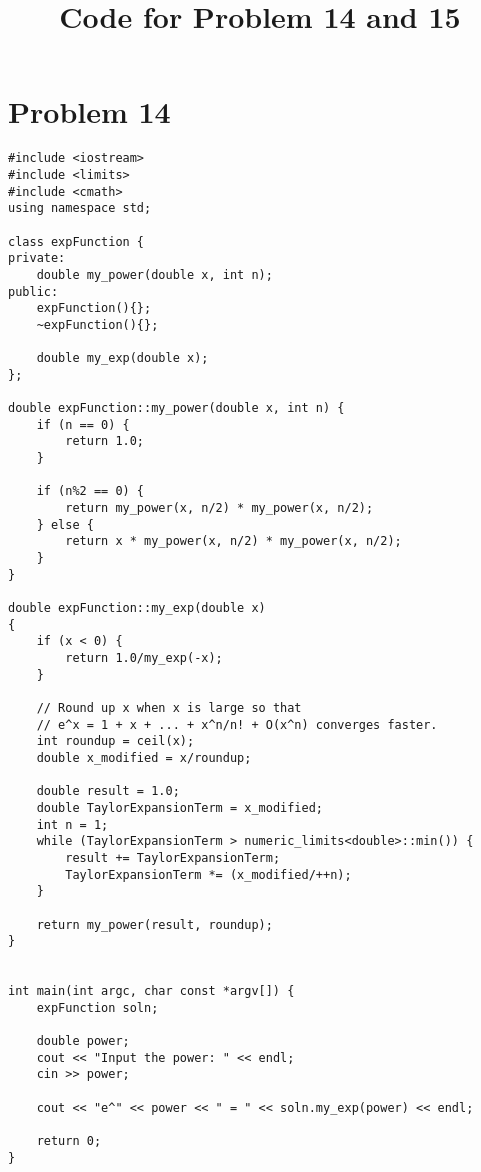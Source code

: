\documentclass[a4paper, 11pt]{amsart}
\theoremstyle{remark}
\numberwithin{equation}{section}
\begin{document}
\title[Code for Problem 14 and 15]{Code for Problem 14 and 15}

\maketitle






\section*{Problem 14}
\begin{lstlisting}
#include <iostream>
#include <limits>
#include <cmath>
using namespace std;

class expFunction {
private:
	double my_power(double x, int n);
public:
	expFunction(){};
	~expFunction(){};

	double my_exp(double x);
};

double expFunction::my_power(double x, int n) {
	if (n == 0) {
		return 1.0;
	}

	if (n%2 == 0) {
		return my_power(x, n/2) * my_power(x, n/2);
	} else {
		return x * my_power(x, n/2) * my_power(x, n/2);
	}
}

double expFunction::my_exp(double x)
{
	if (x < 0) {
		return 1.0/my_exp(-x);
	}

	// Round up x when x is large so that
	// e^x = 1 + x + ... + x^n/n! + O(x^n) converges faster.
	int roundup = ceil(x);
	double x_modified = x/roundup;

	double result = 1.0;
	double TaylorExpansionTerm = x_modified;
	int n = 1;
	while (TaylorExpansionTerm > numeric_limits<double>::min()) {
		result += TaylorExpansionTerm;
		TaylorExpansionTerm *= (x_modified/++n);
	}

	return my_power(result, roundup);
}


int main(int argc, char const *argv[]) {
	expFunction soln;

	double power;
	cout << "Input the power: " << endl;
	cin >> power;

	cout << "e^" << power << " = " << soln.my_exp(power) << endl;

	return 0;
}
\end{lstlisting}

\clearpage
\end{document}
